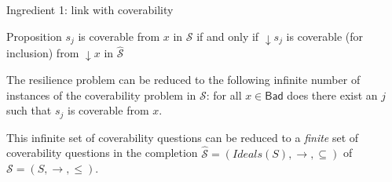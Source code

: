 \documentclass{beamer}
\newcommand{\Bad}{\textsf{Bad}}
\begin{document}
  \begin{frame}{Ingredient 1: link with coverability}
  
  \begin{block}{Proposition}
   $s_j$ is coverable from $x$ in $\mathscr{S}$ if and only if $\mathop{\downarrow} s_j$ is coverable (for inclusion) from $\mathop{\downarrow} x$ in $\hat{\mathscr{S}} $ 
 \end{block}
 
\pause

  \begin{block}{ }
The resilience problem can be reduced to the following infinite number of instances of the coverability problem in $\mathscr{S}$: for all $x \in \Bad$ does there exist an $j$ such that $s_j$ is coverable from $x$.  
 \end{block}
 
 \pause

  \begin{block}{ }
This infinite set of coverability questions can be reduced to a \emph{finite} set of coverability questions in the completion $\hat{\mathscr{S}}=(Ideals(S),\rightarrow, \subseteq)$ of $\mathscr{S}=(S,\rightarrow, \leq)$. 
 \end{block}
 


  \end{frame}
\end{document}
